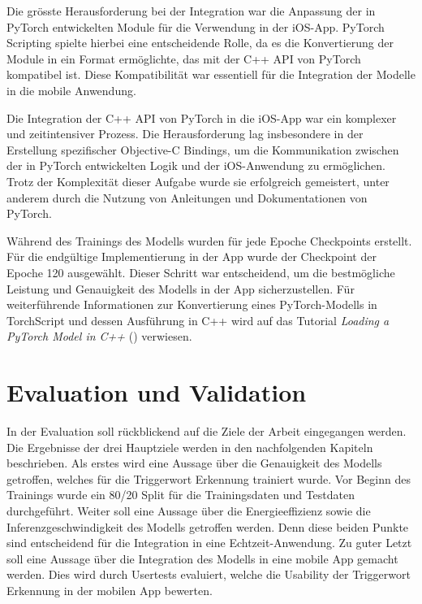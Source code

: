 \documentclass[11pt,a4paper]{article}
\begin{document}
\noindent \newline
Die grösste Herausforderung bei der Integration war die Anpassung der in PyTorch entwickelten Module 
für die Verwendung in der iOS-App. PyTorch Scripting spielte hierbei eine entscheidende Rolle, da 
es die Konvertierung der Module in ein Format ermöglichte, das mit der C++ API von PyTorch 
kompatibel ist. Diese Kompatibilität war essentiell für die Integration der Modelle in die mobile 
Anwendung.

\noindent \newline
Die Integration der C++ API von PyTorch in die iOS-App war ein komplexer und zeitintensiver Prozess. 
Die Herausforderung lag insbesondere in der Erstellung spezifischer Objective-C Bindings, um die 
Kommunikation zwischen der in PyTorch entwickelten Logik und der iOS-Anwendung zu ermöglichen. 
Trotz der Komplexität dieser Aufgabe wurde sie erfolgreich gemeistert, unter anderem durch die 
Nutzung von Anleitungen und Dokumentationen von PyTorch.

\noindent \newline
Während des Trainings des Modells wurden für jede Epoche Checkpoints erstellt. Für die endgültige 
Implementierung in der App wurde der Checkpoint der Epoche 120 ausgewählt. Dieser Schritt war 
entscheidend, um die bestmögliche Leistung und Genauigkeit des Modells in der App sicherzustellen. 
Für weiterführende Informationen zur Konvertierung eines PyTorch-Modells in TorchScript und dessen 
Ausführung in C++ wird auf das Tutorial \textit{Loading a PyTorch Model in C++} 
(\cite{pytorch2023jit}) verwiesen.


\newpage \section{Evaluation und Validation} \label{sec:evaluation}
In der Evaluation soll rückblickend auf die Ziele der Arbeit eingegangen werden. Die Ergebnisse der 
drei Hauptziele werden in den nachfolgenden Kapiteln beschrieben. Als erstes wird eine Aussage über 
die Genauigkeit des Modells getroffen, welches für die Triggerwort Erkennung trainiert wurde. Vor 
Beginn des Trainings wurde ein 80/20 Split für die Trainingsdaten und Testdaten durchgeführt. 
Weiter soll eine Aussage über die Energieeffizienz sowie die Inferenzgeschwindigkeit des Modells 
getroffen werden. Denn diese beiden Punkte sind entscheidend für die Integration in eine Echtzeit-Anwendung. Zu guter Letzt soll eine Aussage über die Integration des Modells in eine mobile App 
gemacht werden. Dies wird durch Usertests evaluiert, welche die Usability der Triggerwort Erkennung in der 
mobilen App bewerten.
\end{document}

